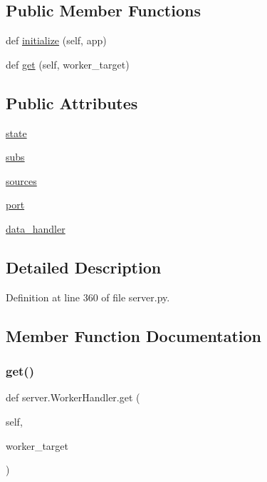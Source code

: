 \subsection*{Public Member Functions}
\begin{DoxyCompactItemize}
\item 
def \hyperlink{classserver_1_1WorkerHandler_ac9a15821c152007d643fc6e8250a1b74}{initialize} (self, app)
\item 
def \hyperlink{classserver_1_1WorkerHandler_a31d87eeea57f178ecf163cf53a18be93}{get} (self, worker\+\_\+target)
\end{DoxyCompactItemize}
\subsection*{Public Attributes}
\begin{DoxyCompactItemize}
\item 
\hyperlink{classserver_1_1WorkerHandler_a89716a189e35063d081d77b89b2b4013}{state}
\item 
\hyperlink{classserver_1_1WorkerHandler_ac0c164cd91b7ed4a21d81f1908c2d099}{subs}
\item 
\hyperlink{classserver_1_1WorkerHandler_a9c1392c52e51d6697273645bada48ac3}{sources}
\item 
\hyperlink{classserver_1_1WorkerHandler_a8e5f034200f695f81dfe03a1366ed391}{port}
\item 
\hyperlink{classserver_1_1WorkerHandler_a909f407723986b24288290f47350713b}{data\+\_\+handler}
\end{DoxyCompactItemize}


\subsection{Detailed Description}


Definition at line 360 of file server.\+py.



\subsection{Member Function Documentation}
\mbox{\label{classserver_1_1WorkerHandler_a31d87eeea57f178ecf163cf53a18be93}} 
\subsubsection{\texorpdfstring{get()}{get()}}
{\footnotesize\ttfamily def server.\+Worker\+Handler.\+get (\begin{DoxyParamCaption}\item[{}]{self,  }\item[{}]{worker\+\_\+target }\end{DoxyParamCaption})}




